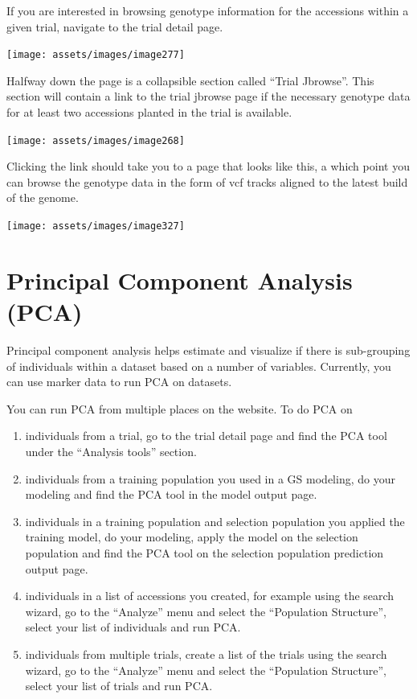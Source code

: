 \documentclass[
  12pt,
]{book}
\begin{document}
If you are interested in browsing genotype information for the accessions within a given trial, navigate to the trial detail page.

\begin{center}\texttt{[image: assets/images/image277]} \end{center}

Halfway down the page is a collapsible section called ``Trial Jbrowse''. This section will contain a link to the trial jbrowse page if the necessary genotype data for at least two accessions planted in the trial is available.

\begin{center}\texttt{[image: assets/images/image268]} \end{center}

Clicking the link should take you to a page that looks like this, a which point you can browse the genotype data in the form of vcf tracks aligned to the latest build of the genome.

\begin{center}\texttt{[image: assets/images/image327]} \end{center}

\hypertarget{principal-component-analysis-pca}{%
\section{Principal Component Analysis (PCA)}\label{principal-component-analysis-pca}}

Principal component analysis helps estimate and visualize if there is sub-grouping of individuals within a dataset based on a number of variables. Currently, you can use marker data to run PCA on datasets.

You can run PCA from multiple places on the website. To do PCA on

\begin{enumerate}
\def\labelenumi{(\arabic{enumi})}
\item
  individuals from a trial, go to the trial detail page and find the PCA tool under the ``Analysis tools'' section.
\item
  individuals from a training population you used in a GS modeling, do your modeling and find the PCA tool in the model output page.
\item
  individuals in a training population and selection population you applied the training model, do your modeling, apply the model on the selection population and find the PCA tool on the selection population prediction output page.
\item
  individuals in a list of accessions you created, for example using the search wizard, go to the ``Analyze'' menu and select the ``Population Structure'', select your list of individuals and run PCA.
\item
  individuals from multiple trials, create a list of the trials using the search wizard, go to the ``Analyze'' menu and select the ``Population Structure'', select your list of trials and run PCA.
\end{enumerate}
\end{document}
